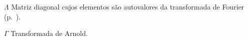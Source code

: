\begin{simbolos}
  \item[$ \Lambda $] Matriz diagonal cujos elementos são autovalores da transformada de Fourier (p.~\pageref{eq:specexp}).
  \item[$\Gamma$] Transformada de Arnold.
\end{simbolos}
